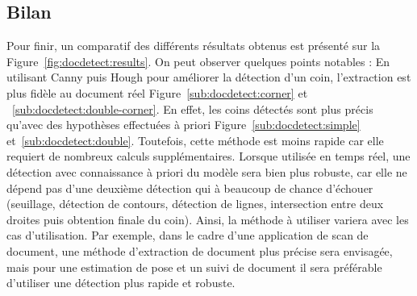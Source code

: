 \subsection{Bilan}
\label{subsec:doc:bilan}
Pour finir, un comparatif des différents résultats obtenus est présenté sur la Figure~\ref{fig:docdetect:results}.
On peut observer quelques points notables : En utilisant Canny puis Hough pour améliorer la détection d'un coin, l'extraction est plus fidèle au document réel Figure~\ref{sub:docdetect:corner} et ~\ref{sub:docdetect:double-corner}. En effet, les coins détectés sont plus précis qu'avec des hypothèses effectuées à priori Figure~\ref{sub:docdetect:simple} et~\ref{sub:docdetect:double}. Toutefois, cette méthode est moins rapide car elle requiert de nombreux calculs supplémentaires. Lorsque utilisée en temps réel, une détection avec connaissance à priori du modèle sera bien plus robuste, car elle ne dépend pas d'une deuxième détection qui à beaucoup de chance d'échouer (seuillage, détection de contours, détection de lignes, intersection entre deux droites puis obtention finale du coin). Ainsi, la méthode à utiliser variera avec les cas d'utilisation. Par exemple, dans le cadre d'une application de scan de document, une méthode d'extraction de document plus précise sera envisagée, mais pour une estimation de pose et un suivi de document il sera préférable d'utiliser une détection plus rapide et robuste.

